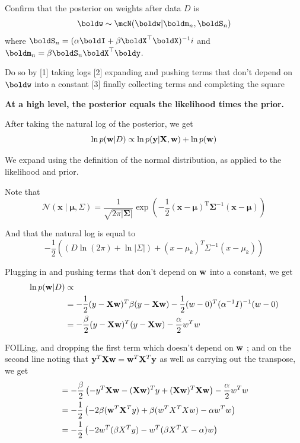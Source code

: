 \documentclass[submit]{harvardml}
\newenvironment{answer}{%
    \color{answergreen}\bf}
  {%
  }
\begin{document}
\begin{enumerate}
Confirm that the posterior on weights after data $D$ is 
$$\boldw\sim\mcN(\boldw|\boldm_n,\boldS_n)$$
where $\boldS_n =(\alpha\boldI+\beta\boldX^\top\boldX)^{-1}i$ and 
$\boldm_n=\beta\boldS_n\boldX^\top\boldy$.

Do so by [1] taking logs 
[2] expanding and pushing terms that don't depend on $\boldw$ into a constant
[3] finally collecting terms and completing the square


\begin{answer}
    At a high level, the posterior equals the likelihood times
    the prior. 
    
    After taking the natural log of the posterior, 
    we get $$ \ln p(\mathbf{w}|D) \propto \ln p(\mathbf{y}|\mathbf{X},\mathbf{w}) + \ln p(\mathbf{w}) $$

    We expand using the definition of the normal distribution, as applied to
    the likelihood and prior. 

    Note that
    $$ \mathcal{N}(\boldsymbol x \mid \boldsymbol\mu, \Sigma)
             = \frac{1}{\sqrt{2\pi|\boldsymbol\Sigma|}}  \exp\left(-\frac 1 2 ({\mathbf x}-{\boldsymbol\mu})^\mathrm{T}{\boldsymbol\Sigma}^{-1}({\mathbf x}-{\boldsymbol\mu})\right)
    $$

            And that the natural log is equal to 
    $$ - \frac{1}{2} \left( ( D \ln(2\pi) + \ln|\Sigma|) + (x - \mu_k)^T \Sigma^{-1} (x-\mu_k) \right)
    $$
    
    Plugging in and pushing terms that don't depend on $\mathbf{w}$ into a constant, we get 
    \begin{align*}
        \ln p(\mathbf{w}|D) &\propto  \\
        &=-\frac{1}{2} (y-\mathbf{X}\mathbf{w})^T \beta(y-\mathbf{X}\mathbf{w}) - \frac{1}{2} (w-0)^T(\alpha^{-1}I)^{-1}(w-0) \\
        &=- \frac{\beta}{2}(y-\mathbf{X}\mathbf{w})^T(y-\mathbf{X}\mathbf{w}) - \frac{\alpha}{2}w^Tw
   \end{align*}

       FOILing, and dropping the first term which doesn't  depend on $\mathbf{w}$ ;
       and on the second line noting that $\mathbf{y}^T\mathbf{X}\mathbf{w} = \mathbf{w}^T\mathbf{X}^T\mathbf{y}$ as well
       as carrying out the transpose, we get
   \begin{align}
           &= - \frac{\beta}{2}     \left( - y^T \mathbf{X}\mathbf{w} - (\mathbf{X}\mathbf{w})^T y + (\mathbf{X}\mathbf{w})^T
           \mathbf{X}\mathbf{w} \right) 
           - \frac{\alpha}{2} w^Tw \\
        &=- \frac{1}{2}\left(- 2 \beta(\mathbf{w}^T \mathbf{X}^Ty) + \beta(w^TX^TXw) - \alpha
        w^Tw \right) \\
        &= - \frac{1}{2} \left( -2w^T(\beta X^Ty)- w^T(\beta X^TX - \alpha)w
        \right) \label{target1}
    \end{align}


\end{answer}
\end{enumerate}
\end{document}
